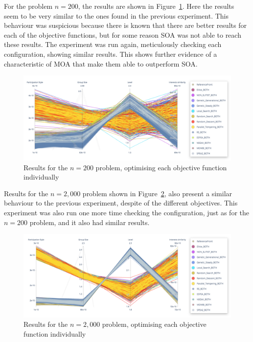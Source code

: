 For the problem $n=200$, the results are shown in Figure~\ref{fig:front_mixed_200}. Here the results seem to be very similar to the ones found in the previous experiment. This behaviour was suspicious because there is known that there are better results for each of the objective functions, but for some reason SOA was not able to reach these results. The experiment was run again, meticulously checking each configuration, showing similar results. This shows further evidence of a characteristic of MOA that make them able to outperform SOA.

\begin{figure}[H]
    \centering
    \includegraphics[width=\textwidth]{images/mixed_front_200.png}
    \caption{Results for the $n=200$ problem, optimising each objective function individually}
    \label{fig:front_mixed_200}
\end{figure}

Results for the $n=2,000$ problem shown in Figure~\ref{fig:front_mixed_2000}, also present a similar behaviour to the previous experiment, despite of the different objectives. This experiment was also run one more time checking the configuration, just as for the $n=200$ problem, and it also had similar results.

\begin{figure}[H]
    \centering
    \includegraphics[width=\textwidth]{images/mixed_front_2000.png}
    \caption{Results for the $n=2,000$ problem, optimising each objective function individually}
    \label{fig:front_mixed_2000}
\end{figure}

